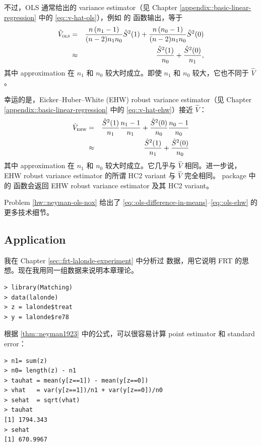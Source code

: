 不过，OLS 通常给出的 variance estimator（见 Chapter \ref{appendix::basic-linear-regression} 中的 \eqref{eq::v-hat-ols}），例如  的  函数输出，等于
\begin{eqnarray}
\label{eq::ols-se}
\hat V_\textsc{ols} &=& \frac{n\left(n_1 -1\right)}{( n-2 ) n_1  n_0 } \hat S^2(1) +\frac{n\left(n_0 -1\right)}{( n-2 ) n_1  n_0 } \hat S^2(0)\\
\nonumber &\approx& \frac{\hat S^2(1)}{n_0 }+\frac{ \hat S^2(0) }{n_1 },
\end{eqnarray}
其中 approximation 在 $ n_1 $ 和 $ n_0 $ 较大时成立。即使 $ n_1 $ 和 $ n_0 $ 较大，它也不同于 $\hat{V}$。


幸运的是，Eicker--Huber--White (EHW) robust variance estimator（见 Chapter \ref{appendix::basic-linear-regression} 中的 \eqref{eq::v-hat-ehw}）接近 $\hat{V}$：
 \begin{eqnarray}
\label{eq::ols-ehw}
\hat V_\textsc{ehw} &=& \frac{\hat S^2(1)}{n_1 } \frac{n_1 -1}{n_1 }+\frac{\hat S^2(0)}{n_0 } \frac{n_0 -1}{n_0 } \\
\nonumber &\approx& \frac{ \hat S^2(1)  }{n_1 }+\frac{ \hat S^2(0) }{n_0 }
\end{eqnarray}
其中 approximation 在 $ n_1 $ 和 $ n_0 $ 较大时成立。它几乎与 $\hat{V}$ 相同。进一步说，EHW robust variance estimator 的所谓 HC2 variant 与 $\hat{V}$ 完全相同。 package 中的  函数会返回 EHW robust variance estimator 及其 HC2 variant。

Problem \ref{hw::neyman-ols-nox} 给出了 \eqref{eq::ols-difference-in-means}--\eqref{eq::ols-ehw} 的更多技术细节。









\subsection{Application}
\label{sec::example-neyman-formula}


我在 Chapter \ref{sec::frt-lalonde-experiment} 中分析过  数据，用它说明 FRT 的思想。现在我用同一组数据来说明本章理论。
\begin{lstlisting}
> library(Matching)
> data(lalonde)
> z = lalonde$treat
> y = lalonde$re78
\end{lstlisting}

根据 \cref{thm::neyman1923} 中的公式，可以很容易计算 point estimator 和 standard error：
\begin{lstlisting}
> n1= sum(z)
> n0= length(z) - n1
> tauhat = mean(y[z==1]) - mean(y[z==0])
> vhat   = var(y[z==1])/n1 + var(y[z==0])/n0
> sehat  = sqrt(vhat)
> tauhat
[1] 1794.343
> sehat
[1] 670.9967
\end{lstlisting}

